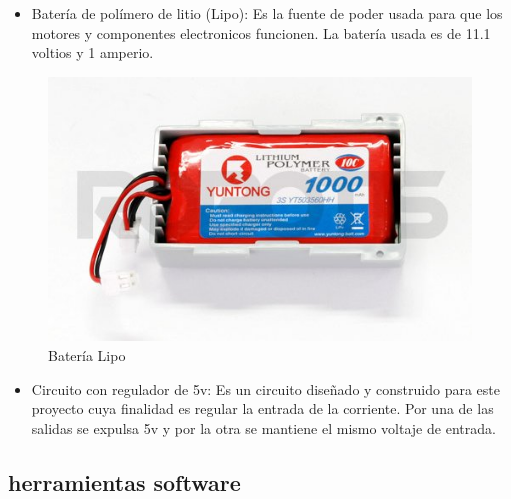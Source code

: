 \begin{itemize}
\item Batería de polímero de litio (Lipo): Es la fuente de poder usada para que los motores y componentes electronicos
funcionen. La batería usada es de 11.1 voltios y 1 amperio. \cite{bateria}
\end{itemize}


\begin{figure}[hbtp]
\centering
\includegraphics[scale=0.5]{imagenes/R-LIPOBAT.jpg}
\caption{Batería Lipo}
\end{figure}

\begin{itemize}
\item Circuito con regulador de 5v: Es un circuito diseñado y construido para este proyecto cuya finalidad es regular la 
entrada de la corriente. Por una de las salidas se expulsa 5v y por la otra se mantiene el mismo voltaje de entrada. 
\end{itemize}


\subsection{ herramientas software }

